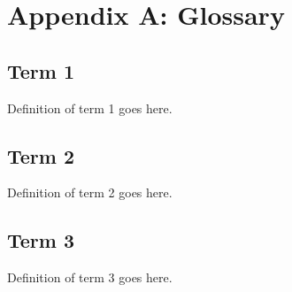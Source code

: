 
\section{Appendix A: Glossary}

\subsection{Term 1}
Definition of term 1 goes here.

\subsection{Term 2}
Definition of term 2 goes here.

\subsection{Term 3}
Definition of term 3 goes here.

